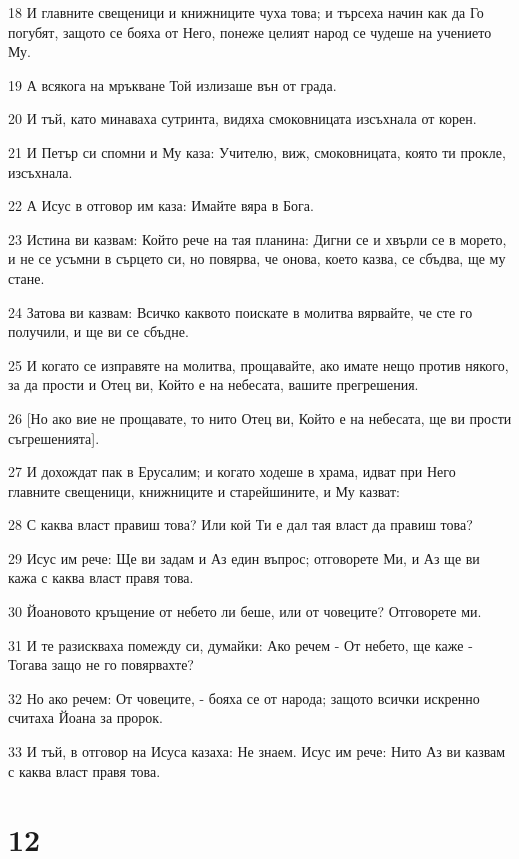 \par 18 И главните свещеници и книжниците чуха това; и търсеха начин как да Го погубят, защото се бояха от Него, понеже целият народ се чудеше на учението Му.
\par 19 А всякога на мръкване Той излизаше вън от града.
\par 20 И тъй, като минаваха сутринта, видяха смоковницата изсъхнала от корен.
\par 21 И Петър си спомни и Му каза: Учителю, виж, смоковницата, която ти прокле, изсъхнала.
\par 22 А Исус в отговор им каза: Имайте вяра в Бога.
\par 23 Истина ви казвам: Който рече на тая планина: Дигни се и хвърли се в морето, и не се усъмни в сърцето си, но повярва, че онова, което казва, се сбъдва, ще му стане.
\par 24 Затова ви казвам: Всичко каквото поискате в молитва вярвайте, че сте го получили, и ще ви се сбъдне.
\par 25 И когато се изправяте на молитва, прощавайте, ако имате нещо против някого, за да прости и Отец ви, Който е на небесата, вашите прегрешения.
\par 26 [Но ако вие не прощавате, то нито Отец ви, Който е на небесата, ще ви прости съгрешенията].
\par 27 И дохождат пак в Ерусалим; и когато ходеше в храма, идват при Него главните свещеници, книжниците и старейшините, и Му казват:
\par 28 С каква власт правиш това? Или кой Ти е дал тая власт да правиш това?
\par 29 Исус им рече: Ще ви задам и Аз един въпрос; отговорете Ми, и Аз ще ви кажа с каква власт правя това.
\par 30 Йоановото кръщение от небето ли беше, или от човеците? Отговорете ми.
\par 31 И те разискваха помежду си, думайки: Ако речем - От небето, ще каже - Тогава защо не го повярвахте?
\par 32 Но ако речем: От човеците, - бояха се от народа; защото всички искренно считаха Йоана за пророк.
\par 33 И тъй, в отговор на Исуса казаха: Не знаем. Исус им рече: Нито Аз ви казвам с каква власт правя това.

\chapter{12}

